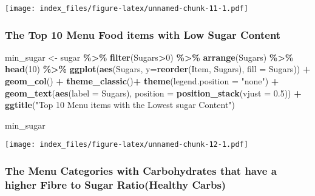 \documentclass[
]{article}
\newenvironment{Shaded}{\begin{snugshade}}{\end{snugshade}}
\newcommand{\AttributeTok}[1]{\textcolor[rgb]{0.13,0.29,0.53}{#1}}
\newcommand{\DecValTok}[1]{\textcolor[rgb]{0.00,0.00,0.81}{#1}}
\newcommand{\FloatTok}[1]{\textcolor[rgb]{0.00,0.00,0.81}{#1}}
\newcommand{\FunctionTok}[1]{\textcolor[rgb]{0.13,0.29,0.53}{\textbf{#1}}}
\newcommand{\NormalTok}[1]{#1}
\newcommand{\OtherTok}[1]{\textcolor[rgb]{0.56,0.35,0.01}{#1}}
\newcommand{\SpecialCharTok}[1]{\textcolor[rgb]{0.81,0.36,0.00}{\textbf{#1}}}
\newcommand{\StringTok}[1]{\textcolor[rgb]{0.31,0.60,0.02}{#1}}
\begin{document}
\texttt{[image: index\_files/figure-latex/unnamed-chunk-11-1.pdf]}

\hypertarget{the-top-10-menu-food-items-with-low-sugar-content}{%
\subsubsection{The Top 10 Menu Food items with Low Sugar
Content}\label{the-top-10-menu-food-items-with-low-sugar-content}}

\begin{Shaded}
\begin{Highlighting}[]
\NormalTok{min\_sugar }\OtherTok{\textless{}{-}}\NormalTok{ sugar }\SpecialCharTok{\%\textgreater{}\%} 
  \FunctionTok{filter}\NormalTok{(Sugars}\SpecialCharTok{\textgreater{}}\DecValTok{0}\NormalTok{) }\SpecialCharTok{\%\textgreater{}\%} 
  \FunctionTok{arrange}\NormalTok{(Sugars) }\SpecialCharTok{\%\textgreater{}\%} 
  \FunctionTok{head}\NormalTok{(}\DecValTok{10}\NormalTok{) }\SpecialCharTok{\%\textgreater{}\%} 
  \FunctionTok{ggplot}\NormalTok{(}\FunctionTok{aes}\NormalTok{(Sugars, }
             \AttributeTok{y=}\FunctionTok{reorder}\NormalTok{(Item,}
\NormalTok{                       Sugars),}
             \AttributeTok{fill =}\NormalTok{ Sugars)) }\SpecialCharTok{+}
  \FunctionTok{geom\_col}\NormalTok{() }\SpecialCharTok{+} 
  \FunctionTok{theme\_classic}\NormalTok{()}\SpecialCharTok{+}
  \FunctionTok{theme}\NormalTok{(}\AttributeTok{legend.position =} \StringTok{"none"}\NormalTok{) }\SpecialCharTok{+} 
  \FunctionTok{geom\_text}\NormalTok{(}\FunctionTok{aes}\NormalTok{(}\AttributeTok{label =}\NormalTok{ Sugars),}
            \AttributeTok{position =} \FunctionTok{position\_stack}\NormalTok{(}\AttributeTok{vjust =} \FloatTok{0.5}\NormalTok{)) }\SpecialCharTok{+} \FunctionTok{ggtitle}\NormalTok{(}\StringTok{"Top 10 Menu items with the Lowest sugar Content"}\NormalTok{)}


\NormalTok{min\_sugar}
\end{Highlighting}
\end{Shaded}

\texttt{[image: index\_files/figure-latex/unnamed-chunk-12-1.pdf]}

\hypertarget{the-menu-categories-with-carbohydrates-that-have-a-higher-fibre-to-sugar-ratiohealthy-carbs}{%
\subsubsection{The Menu Categories with Carbohydrates that have a higher
Fibre to Sugar Ratio(Healthy
Carbs)}\label{the-menu-categories-with-carbohydrates-that-have-a-higher-fibre-to-sugar-ratiohealthy-carbs}}
\end{document}
